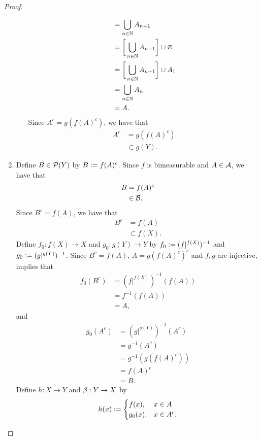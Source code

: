 \documentclass{book}
\begin{document}
\begin{proof}
\begin{enumerate}
\begin{itemize}
\begin{align*}
					& = \bigcup\limits_{n \in \mathbb{N}} A_{n+1} \\
					& = \bigg[ \bigcup\limits_{n \in \mathbb{N}} A_{n+1} \bigg] \cup \varnothing \\
					& = \bigg[ \bigcup\limits_{n \in \mathbb{N}} A_{n+1} \bigg] \cup A_1 \\
					& = \bigcup\limits_{n \in \mathbb{N}} A_n \\
					& = A.
				\end{align*}
				Since $A^c = g(f(A)^c)$, we have that 
				\begin{align*}
					A^c 
					& = g(f(A)^c) \\
					& \subset g(Y).
				\end{align*}
			\end{itemize}
			\item 
			Define $B \in \mathcal{P}(Y)$ by $B \vcentcolon= f(A)^c$. Since $f$ is bimeasurable and $A \in \mathcal{A}$, we have that  
			\begin{align*}
				B
				& = f(A)^c \\
				& \in \mathcal{B}. 
			\end{align*}
			Since $B^c = f(A)$, we have that
			\begin{align*}
				B^c 
				& = f(A) \\
				& \subset f(X).
			\end{align*}
			Define $f_0: f(X) \rightarrow X$ and $g_0:g(Y) \rightarrow Y$ by $f_0 \vcentcolon= (f|^{f(X)})^{-1}$ and $g_0 \vcentcolon= (g|^{g(Y)})^{-1}$. Since $B^c = f(A)$, $A = g(f(A)^c)^c$ and $f, g$ are injective,  implies that 
			\begin{align*}
				f_0(B^c) 
				& = (f|^{f(X)})^{-1}(f(A)) \\
				& = f^{-1}(f(A)) \\
				& = A,
			\end{align*}
			and
			\begin{align*}
				g_0(A^c)
				& = (g|^{g(Y)})^{-1}(A^c) \\
				& = g^{-1}(A^c) \\
				& = g^{-1}(g(f(A)^c)) \\
				& = f(A)^c \\
				& = B.
			\end{align*}
			Define $h:X \rightarrow Y$ and $\beta: Y \rightarrow X$ by 
			\[
			h(x) \vcentcolon= 
			\begin{cases}
				f(x), & x \in A \\
				g_0(x),  & x \in A^c.
			\end{cases}
\]
\end{enumerate}
\end{proof}
\end{document}
